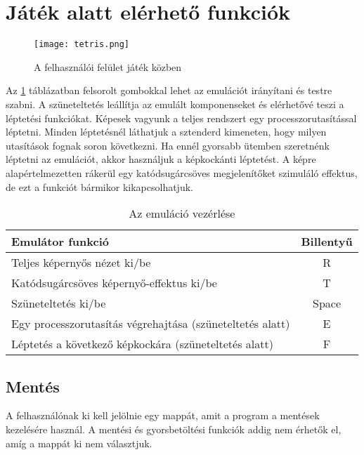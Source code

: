 \section{Játék alatt elérhető funkciók}

\begin{figure}[H]
	\centering
	\texttt{[image: tetris.png]}
	\caption{A felhasználói felület játék közben\protect\footnotemark}
\end{figure}

Az \ref{fig:emucontrol} táblázatban felsorolt gombokkal lehet az emulációt irányítani és testre szabni. A szüneteltetés leállítja az emulált komponenseket és elérhetővé teszi a léptetési funkciókat. Képesek vagyunk a teljes rendszert egy processzorutasítással léptetni. Minden léptetésnél láthatjuk a sztenderd kimeneten, hogy milyen utasítások fognak soron következni. Ha ennél gyorsabb ütemben szeretnénk léptetni az emulációt, akkor használjuk a képkockánti léptetést. A képre alapértelmezetten rákerül egy katódsugárcsöves megjelenítőket szimuláló effektus, de ezt a funkciót bármikor kikapcsolhatjuk.

\begin{table}[H]
	\centering
	\begin{tabular}{ | l | c | }
		\hline
		Emulátor funkció & Billentyű \\
		\hline			
		Teljes képernyős nézet ki/be & R \\
		Katódsugárcsöves képernyő-effektus ki/be & T \\
		Szüneteltetés ki/be & Space \\
		Egy processzorutasítás végrehajtása (szüneteltetés alatt) & E \\
		Léptetés a következő képkockára (szüneteltetés alatt) & F \\
		\hline
	\end{tabular}
	\caption{Az emuláció vezérlése}
	\label{fig:emucontrol}
\end{table}

\subsection{Mentés}

A felhasználónak ki kell jelölnie egy mappát, amit a program a mentések kezelésére használ. A mentési és gyorsbetöltési funkciók addig nem érhetők el, amíg a mappát ki nem választjuk.

